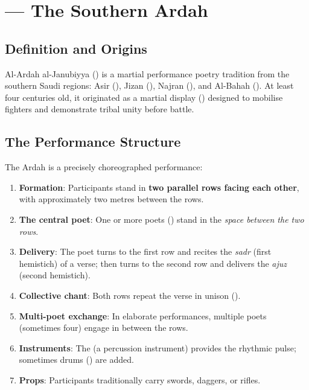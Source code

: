 \section{ — The Southern Ardah}
\label{sec:ardah}

\subsection{Definition and Origins}

Al-Ardah al-Janubiyya () is a martial performance poetry tradition from the southern Saudi regions: Asir (), Jizan (), Najran (), and Al-Bahah (). At least four centuries old, it originated as a martial display () designed to mobilise fighters and demonstrate tribal unity before battle.

\subsection{The Performance Structure}

The Ardah is a precisely choreographed performance:
\begin{enumerate}
  \item \textbf{Formation}: Participants stand in \textbf{two parallel rows facing each other}, with approximately two metres between the rows.
  \item \textbf{The central poet}: One or more poets () stand in the \textit{space between the two rows}.
  \item \textbf{Delivery}: The poet turns to the first row and recites the \textit{sadr} (first hemistich) of a verse; then turns to the second row and delivers the \textit{ajuz} (second hemistich).
  \item \textbf{Collective chant}: Both rows repeat the verse in unison ().
  \item \textbf{Multi-poet exchange}: In elaborate performances, multiple poets (sometimes four) engage in  between the rows.
  \item \textbf{Instruments}: The  (a percussion instrument) provides the rhythmic pulse; sometimes drums () are added.
  \item \textbf{Props}: Participants traditionally carry swords, daggers, or rifles.
\end{enumerate}

